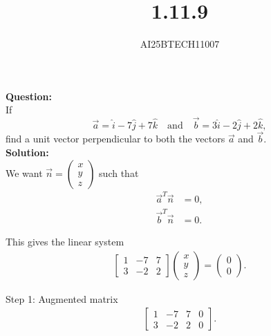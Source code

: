 \documentclass[journal]{IEEEtran}
\begin{document}

\vspace{3cm}

\title{1.11.9}
\author{AI25BTECH11007}
 \maketitle
{\let\newpage\relax\maketitle}

\renewcommand{\thefigure}{\theenumi}
\renewcommand{\thetable}{\theenumi}
\setlength{\intextsep}{10pt} %


\renewcommand{\thetable}{\theenumi}
\noindent
\textbf{Question:}\\
If
\[
\vec{a} = \hat{i} - 7\hat{j} + 7\hat{k}
\quad \text{and} \quad
\vec{b} = 3\hat{i} - 2\hat{j} + 2\hat{k},
\]
find a unit vector perpendicular to both the vectors $\vec{a}$ and $\vec{b}$.\\
\textbf{Solution:}\\
We want $\vec{n} = \begin{pmatrix}x\\y\\z\end{pmatrix}$ such that
\begin{align}
\vec{a}^T \vec{n} &= 0, \label{eq:orth1}\\
\vec{b}^T \vec{n} &= 0. \label{eq:orth2}
\end{align}

This gives the linear system
\begin{align}
\begin{bmatrix}
1 & -7 & 7\\
3 & -2 & 2
\end{bmatrix}
\begin{pmatrix}x\\y\\z\end{pmatrix}
= \begin{pmatrix}0\\0\end{pmatrix}. \label{eq:system}
\end{align}

Step 1: Augmented matrix\\
\begin{align}
\left[\begin{array}{ccc|c}
1 & -7 & 7 & 0\\
3 & -2 & 2 & 0
\end{array}\right]. \label{eq:aug}
\end{align}
\end{document}
